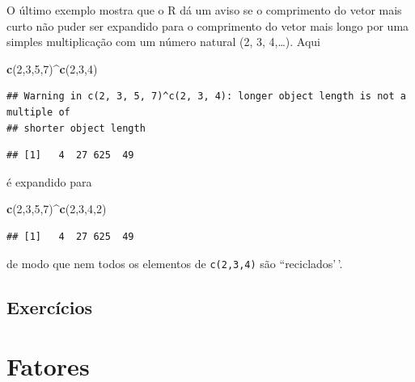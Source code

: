 \documentclass[
]{book}
\newenvironment{Shaded}{\begin{snugshade}}{\end{snugshade}}
\newcommand{\DecValTok}[1]{\textcolor[rgb]{0.00,0.00,0.81}{#1}}
\newcommand{\FunctionTok}[1]{\textcolor[rgb]{0.13,0.29,0.53}{\textbf{#1}}}
\newcommand{\NormalTok}[1]{#1}
\newcommand{\SpecialCharTok}[1]{\textcolor[rgb]{0.81,0.36,0.00}{\textbf{#1}}}
\begin{document}
O último exemplo mostra que o R dá um aviso se o comprimento do vetor mais curto não puder ser expandido para o comprimento do vetor mais longo por uma simples multiplicação com um número natural (2, 3, 4,\ldots). Aqui

\begin{Shaded}
\begin{Highlighting}[]
\FunctionTok{c}\NormalTok{(}\DecValTok{2}\NormalTok{,}\DecValTok{3}\NormalTok{,}\DecValTok{5}\NormalTok{,}\DecValTok{7}\NormalTok{)}\SpecialCharTok{\^{}}\FunctionTok{c}\NormalTok{(}\DecValTok{2}\NormalTok{,}\DecValTok{3}\NormalTok{,}\DecValTok{4}\NormalTok{)}
\end{Highlighting}
\end{Shaded}

\begin{verbatim}
## Warning in c(2, 3, 5, 7)^c(2, 3, 4): longer object length is not a multiple of
## shorter object length
\end{verbatim}

\begin{verbatim}
## [1]   4  27 625  49
\end{verbatim}

é expandido para

\begin{Shaded}
\begin{Highlighting}[]
\FunctionTok{c}\NormalTok{(}\DecValTok{2}\NormalTok{,}\DecValTok{3}\NormalTok{,}\DecValTok{5}\NormalTok{,}\DecValTok{7}\NormalTok{)}\SpecialCharTok{\^{}}\FunctionTok{c}\NormalTok{(}\DecValTok{2}\NormalTok{,}\DecValTok{3}\NormalTok{,}\DecValTok{4}\NormalTok{,}\DecValTok{2}\NormalTok{)}
\end{Highlighting}
\end{Shaded}

\begin{verbatim}
## [1]   4  27 625  49
\end{verbatim}

de modo que nem todos os elementos de \verb|c(2,3,4)| são ``reciclados'\,'.

\subsection{Exercícios}\label{exercuxedcios-1}

\section{Fatores}\label{fatores}
\end{document}

